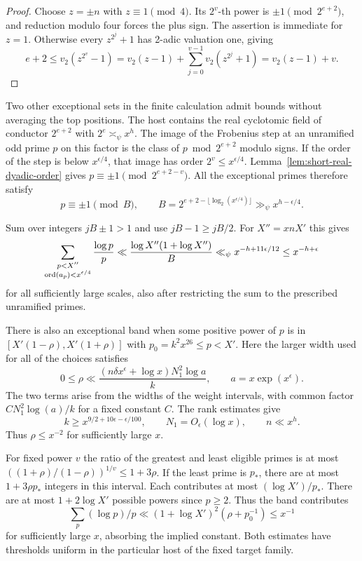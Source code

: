 \begin{proof}
Choose \(z=\pm n\) with \(z\equiv1\pmod4\). Its \(2^v\)-th power is
\(\pm1\pmod{2^{e+2}}\), and reduction modulo four forces the plus sign.
The assertion is immediate for \(z=1\). Otherwise every
\(z^{2^j}+1\) has 2-adic valuation one, giving
\[
 e+2\le v_2(z^{2^v}-1)
      =v_2(z-1)+\sum_{j=0}^{v-1}v_2(z^{2^j}+1)=v_2(z-1)+v .
\]
\end{proof}

Two other exceptional sets in the finite calculation admit
bounds without averaging the top positions. The host contains
the real cyclotomic field of conductor \(2^{e+2}\) with
\(2^e\asymp_\psi x^h\). The image of the Frobenius step
at an unramified odd prime \(p\) on this factor is the class
of \(p\bmod 2^{e+2}\) modulo signs. If the order of the
step is below \(x^{\epsilon/4}\), that image has order
\(2^v\le x^{\epsilon/4}\). Lemma~\ref{lem:short-real-dyadic-order} gives
\(p\equiv\pm1\pmod{2^{e+2-v}}\). All the exceptional primes therefore satisfy
\[
 p\equiv\pm1\pmod B,\qquad B=2^{e+2-\lfloor\log_2(x^{\epsilon/4})\rfloor}\gg_\psi x^{h-\epsilon/4}.
\]

Sum over integers \(jB\pm1>1\) and use \(jB-1\ge jB/2\).
For \(X''=xnX'\) this gives
\[
 \sum_{\substack{p<X''\\ {\rm ord}(a_p)<x^{\epsilon/4}}}
              \frac{\log p}{p}
 \ll \frac{\log X''(1+\log X'')}{B}
 \ll_\psi x^{-h+11\epsilon/12}\le x^{-h+\epsilon}
\]
for all sufficiently large scales, also after restricting the sum to the prescribed unramified primes.

There is also an exceptional band when some positive power
of \(p\) is in \([X'(1-\rho),X'(1+\rho)]\) with
\(p_0=k^2x^{26}\le p<X'\). Here the larger width used
for all of the choices satisfies
\[
 0\le\rho\ll
  \frac{(n\delta x^\epsilon+\log x)N_1^2\log a}{k},
 \qquad a=x\exp(x^\epsilon).
\]
The two terms arise from the widths of the weight intervals,
with common factor \(C N_1^2\log(a)/k\) for a fixed constant
\(C\). The rank estimates give
\[
 k\ge x^{9/2+10\epsilon-\epsilon/100},\qquad
 N_1=O_\epsilon(\log x),\qquad n\ll x^h .
\]
Thus \(\rho\le x^{-2}\) for sufficiently large \(x\).

For fixed power \(v\)
the ratio of the greatest and least eligible primes is
at most \(((1+\rho)/(1-\rho))^{1/v}\le1+3\rho\).
If the least prime is \(p_*\), there are at most
\(1+3\rho p_*\) integers in this interval. Each contributes
at most \((\log X')/p_*\). There are at most
\(1+2\log X'\) possible powers since \(p\ge2\).
Thus the band contributes
\[
  \sum_p (\log p)/p\ll (1+\log X')^2(\rho+p_0^{-1})
                    \le x^{-1}
\]
for sufficiently large \(x\), absorbing the implied constant.
Both estimates have thresholds uniform in the particular
host of the fixed target family.

